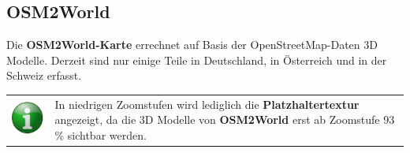 \documentclass[10pt]{scrreprt}
\begin{document}
\newpage
\subsection{OSM2World}  
Die \textbf{OSM2World-Karte} errechnet auf Basis der OpenStreetMap-Daten 3D Modelle. Derzeit sind nur einige Teile in Deutschland, in Österreich und in der Schweiz erfasst.


\vspace{3mm}
\begin{figure}[!htb]
	\centering
    \hspace{5mm}
\end{figure}

\vspace{3mm}
\begin{tabular}{>{\centering \arraybackslash}m{1cm} m{14cm}} \index{Platzhaltertextur} \index{Textur!Platzhaltertextur}
\includegraphics[scale=0.5]{images/info.eps} &  In niedrigen Zoomstufen wird lediglich die \textbf{Platzhaltertextur} angezeigt, da die 3D Modelle von \textbf{OSM2World} erst ab Zoomstufe 93 \% sichtbar werden.
\end{tabular}
\end{document}

